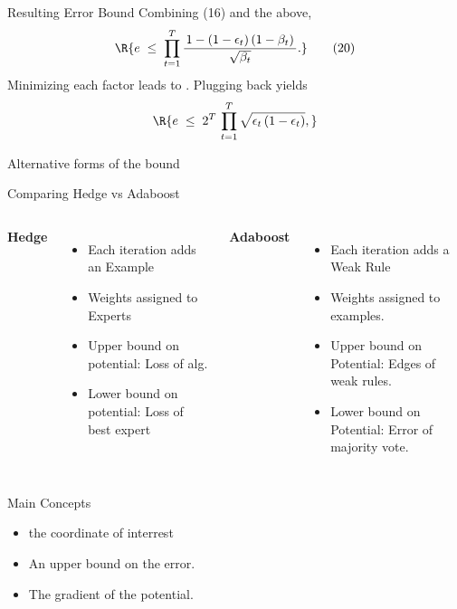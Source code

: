 \documentclass[handout]{beamer}
\begin{document}
\begin{frame}{Resulting Error Bound}
Combining (16) and the above,
\[
  \R{
    e 
    \;\le\;
    \prod_{t=1}^T \frac{\,1 - (1-\epsilon_t)\,(1-\beta_t)\,}{\sqrt{\beta_t}}.
  }
  \tag{20}
\]
Minimizing each factor leads to . Plugging back yields
\[
  \R{
    e 
    \;\le\;
    2^T \,\prod_{t=1}^T \sqrt{\epsilon_t\,(1-\epsilon_t)},
  }
\]
\end{frame}

\begin{frame}{Alternative forms of the bound}
\end{frame}



\begin{frame}{Comparing Hedge vs Adaboost}
  \begin{columns}[T,onlytextwidth] 

    \textbf{Hedge}
    \begin{itemize}
      \item Each iteration adds an Example
      \item Weights assigned to Experts
      \item Upper bound on potential: Loss of alg.
      \item Lower bound on potential: Loss of best expert
    \end{itemize}

    \textbf{Adaboost}
    \begin{itemize}
    \item Each iteration adds a Weak Rule
    \item Weights assigned to examples.
    \item Upper bound on Potential: Edges of weak rules.
    \item Lower bound on Potential: Error of majority vote.
    \end{itemize}

  \end{columns}
\end{frame}

\begin{frame}{Main Concepts}
  \begin{itemize}
    \item {} the coordinate of interrest 
  \item {} An upper bound on the error. 
  \item {} The gradient of the potential. 
  \end{itemize}

  
  \end{frame}
\end{document}
